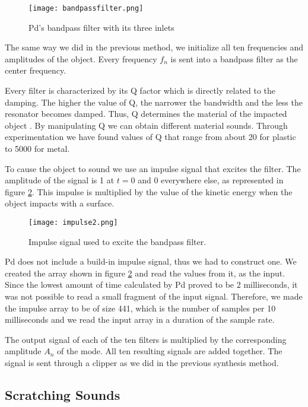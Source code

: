 \begin{figure}[H]
  \centering
    \texttt{[image: bandpassfilter.png]}
      \caption{Pd's bandpass filter with its three inlets}
      \label{fig:pdbandpass}
\end{figure} 

The same way we did in the previous method, we initialize all ten frequencies and amplitudes of the object. Every frequency $f_n$ is sent into a bandpass filter as the center frequency. 

Every filter is characterized by its Q factor which is directly related to the damping. The higher the value of Q, the narrower the bandwidth and the less the resonator becomes damped. Thus, Q determines the material of the impacted object \cite{gaver1993we}. By manipulating Q we can obtain different material sounds. Through experimentation we have found values of Q that range from about 20 for plastic to 5000 for metal. 

To cause the object to sound we use an impulse signal that excites the filter. The amplitude of the signal is 1 at $t=0$ and 0 everywhere else, as represented in figure \ref{fig:impulse}. This impulse is multiplied by the value of the kinetic energy when the object impacts with a surface. 

\begin{figure}[H]
  \centering
    \texttt{[image: impulse2.png]}
      \caption{Impulse signal used to excite the bandpass filter.}
      \label{fig:impulse}
\end{figure} 

Pd does not include a build-in impulse signal, thus we had to construct one. We created the array shown in figure \ref{fig:impulse} and read the values from it, as the input. Since the lowest amount of time calculated by Pd proved to be 2 milliseconds, it was not possible to read a small fragment of the input signal. Therefore, we made the impulse array to be of size 441, which is the number of samples per 10 milliseconds and we read the input array in a duration of the sample rate.

The output signal of each of the ten filters is multiplied by the corresponding amplitude $A_n$ of the mode. All ten resulting signals are added together. The signal is sent through a clipper as we did in the previous synthesis method.

\subsection{Scratching Sounds}

